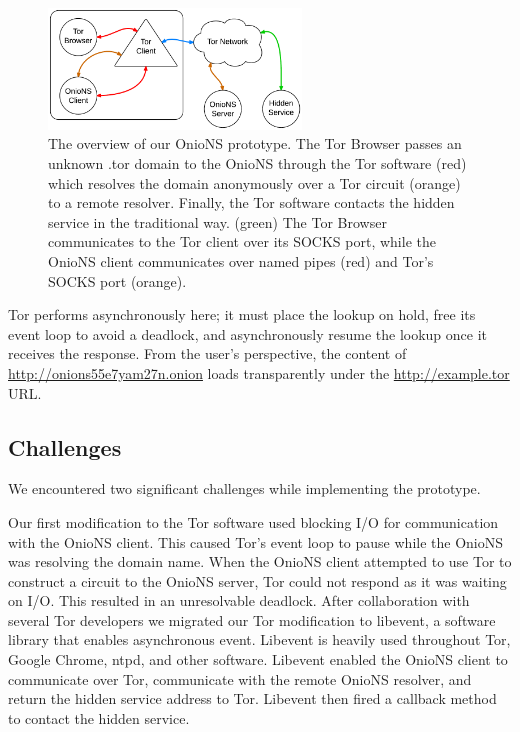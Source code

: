 \begin{figure}[htbp]
	\centering
	\includegraphics[width=0.6\textwidth]{images/LucidCharts/OnioNS_Prototype.pdf}
	\caption{The overview of our OnioNS prototype. The Tor Browser passes an unknown .tor domain to the OnioNS through the Tor software (red) which resolves the domain anonymously over a Tor circuit (orange) to a remote resolver. Finally, the Tor software contacts the hidden service in the traditional way. (green) The Tor Browser communicates to the Tor client over its SOCKS port, while the OnioNS client communicates over named pipes (red) and Tor's SOCKS port (orange).}
	\label{fig:prototypeDiagram}
\end{figure}

Tor performs asynchronously here; it must place the lookup on hold, free its event loop to avoid a deadlock, and asynchronously resume the lookup once it receives the response. From the user's perspective, the content of \url{http://onions55e7yam27n.onion} loads transparently under the \url{http://example.tor} URL.

\subsection{Challenges}

We encountered two significant challenges while implementing the prototype. 

Our first modification to the Tor software used blocking I/O for communication with the OnioNS client. This caused Tor's event loop to pause while the OnioNS was resolving the domain name. When the OnioNS client attempted to use Tor to construct a circuit to the OnioNS server, Tor could not respond as it was waiting on I/O. This resulted in an unresolvable deadlock. After collaboration with several Tor developers we migrated our Tor modification to libevent, a software library that enables asynchronous event. Libevent is heavily used throughout Tor, Google Chrome, ntpd, and other software. Libevent enabled the OnioNS client to communicate over Tor, communicate with the remote OnioNS resolver, and return the hidden service address to Tor. Libevent then fired a callback method to contact the hidden service.

